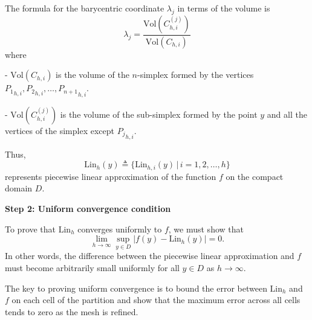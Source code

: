\documentclass[preprint,12pt]{elsarticle}
\begin{document}
The formula for the barycentric coordinate \( \lambda_j \) in terms of the volume is
\[
\lambda_j = \frac{\text{Vol}(C_{h,i}^{(j)})}{\text{Vol}(C_{h,i})}
\]
where

- \( \text{Vol}(C_{h,i}) \) is the volume of the \( n \)-simplex formed by the vertices \( {P_1}_{h,i}, {P_2}_{h,i}, \dots, {P_{n+1}}_{h,i} \).

- \( \text{Vol}(C_{h,i}^{(j)}) \) is the volume of the sub-simplex formed by the point \( y \) and all the vertices of the simplex except \( {P_j}_{h,i} \).

Thus,
\begin{equation}\label{Lin_h}
\text{Lin}_{h}(y)\triangleq\{ \text{Lin}_{h,i}(y)\, | \,  i=1,2,\dots,h \}
\end{equation}
represents piecewise linear approximation of the function $f$ on the compact domain $D$.

\medskip
{\bf Step 2: Uniform convergence condition}

To prove that \( \text{Lin}_h \) converges uniformly to \( f \), we must show that
\[
\lim_{h \to \infty} \sup_{{y} \in D} |f({y})-\text{Lin}_{h}(y)| = 0.
\]
In other words, the difference between the piecewise linear approximation and \( f \) must become arbitrarily small uniformly for all \( {y} \in D \) as \( h \to \infty \).


The key to proving uniform convergence is to bound the error between \( \text{Lin}_h \) and \( f \) on each cell of the partition and show that the maximum error across all cells tends to zero as the mesh is refined.
\end{document}
